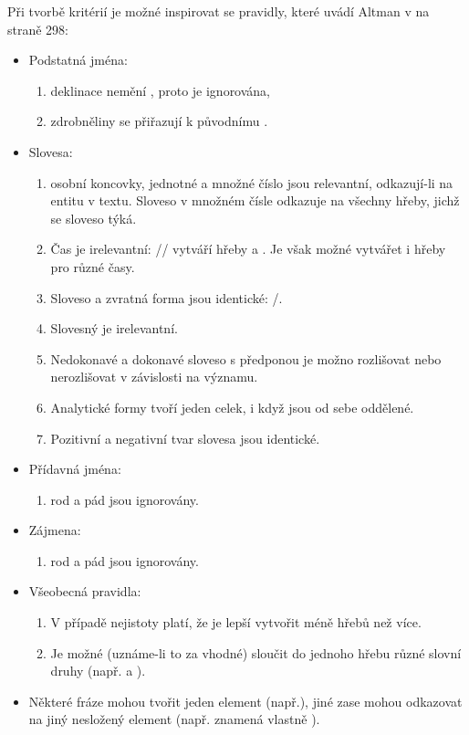 \documentclass[dp.tex]{subfiles}
\begin{document}
Při tvorbě kritérií je možné inspirovat se pravidly, které uvádí Altman v \cite{Wimmer2003} na straně 298:
\begin{oldquote}
\begin{itemize}
\item Podstatná jména:
\begin{enumerate}
\item deklinace nemění  , proto je ignorována,
\item zdrobněliny se přiřazují k původnímu .
\end{enumerate}
\item Slovesa:
\begin{enumerate}
\item osobní koncovky, jednotné a množné číslo jsou relevantní, odkazují-li na entitu v textu. Sloveso v množném čísle odkazuje na všechny hřeby, jichž se sloveso týká.
\item Čas je irelevantní: // vytváří hřeby  a . Je však možné vytvářet i hřeby pro různé časy.
\item Sloveso a zvratná forma jsou identické: /.
\item Slovesný  je irelevantní.
\item Nedokonavé a dokonavé sloveso s předponou je možno rozlišovat nebo nerozlišovat v závislosti na významu.
\item Analytické formy tvoří jeden celek, i když jsou od sebe oddělené.
\item Pozitivní a negativní tvar slovesa jsou identické.
\end{enumerate}
\item Přídavná jména:
\begin{enumerate}
\item rod a pád jsou ignorovány.
\end{enumerate}
\item Zájmena:
\begin{enumerate}
\item rod a pád jsou ignorovány.
\end{enumerate}
\item Všeobecná pravidla:
\begin{enumerate}
\item V případě nejistoty platí, že je lepší vytvořit méně hřebů než více.
\item Je možné (uznáme-li to za vhodné) sloučit do jednoho hřebu různé slovní druhy (např.  a ).
\end{enumerate}
\item Některé fráze mohou tvořit jeden element (např.), jiné zase mohou odkazovat na jiný nesložený element (např.  znamená vlastně ).
\end{itemize}
\end{oldquote}
\end{document}
